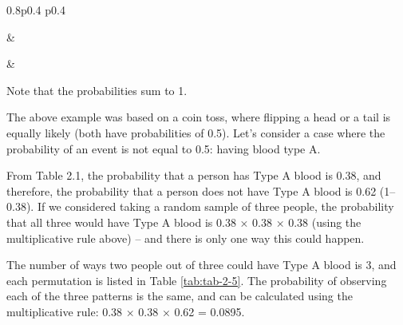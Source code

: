 \documentclass[
]{memoir}
\begin{document}
\begin{table}[ht]
\begin{centerbox}
\begin{threeparttable}
\begin{tabularx}{0.8\textwidth}{p{} p{}}
\hhline{}

 &
 \tabularnewline[-0.5pt]


\hhline{}

 &
 \tabularnewline[-0.5pt]


\end{tabularx}
\end{threeparttable}\par\end{centerbox}

\end{table}
 

Note that the probabilities sum to 1.

The above example was based on a coin toss, where flipping a head or a tail is equally likely (both have probabilities of 0.5). Let's consider a case where the probability of an event is not equal to 0.5: having blood type A.

From Table 2.1, the probability that a person has Type A blood is 0.38, and therefore, the probability that a person does not have Type A blood is 0.62 (1--0.38). If we considered taking a random sample of three people, the probability that all three would have Type A blood is 0.38 × 0.38 × 0.38 (using the multiplicative rule above) -- and there is only one way this could happen.

The number of ways two people out of three could have Type A blood is 3, and each permutation is listed in Table \ref{tab:tab-2-5}. The probability of observing each of the three patterns is the same, and can be calculated using the multiplicative rule: 0.38 × 0.38 × 0.62 = 0.0895.
\end{document}
